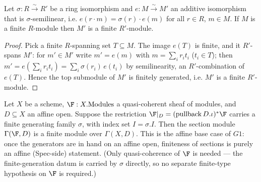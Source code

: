 \begin{lemma}

  \label{lem:module_finite_of_ringEquiv_semilinear}
  Let \(\sigma : R \xrightarrow{\sim} R'\) be a ring isomorphism and
  \(e : M \xrightarrow{\sim} M'\) an additive isomorphism that is \(\sigma\)-semilinear,
  i.e. \(e(r \cdot m) = \sigma(r) \cdot e(m)\) for all \(r \in R\), \(m \in M\). If
  \(M\) is a finite \(R\)-module then \(M'\) is a finite \(R'\)-module.
\end{lemma}

\begin{proof}

\leanok
  Pick a finite \(R\)-spanning set \(T \subseteq M\). The image \(e(T)\) is finite, and
  it \(R'\)-spans \(M'\): for \(m' \in M'\) write \(m' = e(m)\) with
  \(m = \sum_i r_i t_i\) (\(t_i \in T\)); then
  \(m' = e(\sum_i r_i t_i) = \sum_i \sigma(r_i)\, e(t_i)\) by semilinearity, an
  \(R'\)-combination of \(e(T)\). Hence the top submodule of \(M'\) is finitely
  generated, i.e. \(M'\) is a finite \(R'\)-module.
\end{proof}

\begin{lemma}
  \label{lem:gf_qcoh_finite_sections_of_genSections}
  Let \(X\) be a scheme, \(\F : X.\mathrm{Modules}\) a quasi-coherent sheaf of modules, and
  \(D \subseteq X\) an affine open. Suppose the restriction
  \(\F|_D = (\mathrm{pullback}\,D.\iota)^{*}\F\) carries a finite generating family
  \(\sigma\), with index set \(I = \sigma.I\). Then the section module
  \(\Gamma(\F, D)\) is a finite module over \(\Gamma(X, D)\). This is the affine base
  case of \(G1\): once the generators are in hand on an affine open, finiteness of
  sections is purely an affine (Spec-side) statement. (Only quasi-coherence of \(\F\) is
  needed — the finite-generation datum is carried by \(\sigma\) directly, so no separate
  finite-type hypothesis on \(\F\) is required.)
\end{lemma}

